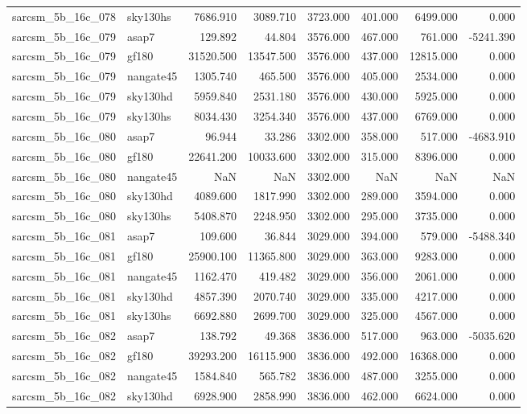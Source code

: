 \begin{tabular}{llrrrrrr}
sarcsm\_5b\_16c\_078 & sky130hs & 7686.910 & 3089.710 & 3723.000 & 401.000 & 6499.000 & 0.000 \\
sarcsm\_5b\_16c\_079 & asap7 & 129.892 & 44.804 & 3576.000 & 467.000 & 761.000 & -5241.390 \\
sarcsm\_5b\_16c\_079 & gf180 & 31520.500 & 13547.500 & 3576.000 & 437.000 & 12815.000 & 0.000 \\
sarcsm\_5b\_16c\_079 & nangate45 & 1305.740 & 465.500 & 3576.000 & 405.000 & 2534.000 & 0.000 \\
sarcsm\_5b\_16c\_079 & sky130hd & 5959.840 & 2531.180 & 3576.000 & 430.000 & 5925.000 & 0.000 \\
sarcsm\_5b\_16c\_079 & sky130hs & 8034.430 & 3254.340 & 3576.000 & 437.000 & 6769.000 & 0.000 \\
sarcsm\_5b\_16c\_080 & asap7 & 96.944 & 33.286 & 3302.000 & 358.000 & 517.000 & -4683.910 \\
sarcsm\_5b\_16c\_080 & gf180 & 22641.200 & 10033.600 & 3302.000 & 315.000 & 8396.000 & 0.000 \\
sarcsm\_5b\_16c\_080 & nangate45 & NaN & NaN & 3302.000 & NaN & NaN & NaN \\
sarcsm\_5b\_16c\_080 & sky130hd & 4089.600 & 1817.990 & 3302.000 & 289.000 & 3594.000 & 0.000 \\
sarcsm\_5b\_16c\_080 & sky130hs & 5408.870 & 2248.950 & 3302.000 & 295.000 & 3735.000 & 0.000 \\
sarcsm\_5b\_16c\_081 & asap7 & 109.600 & 36.844 & 3029.000 & 394.000 & 579.000 & -5488.340 \\
sarcsm\_5b\_16c\_081 & gf180 & 25900.100 & 11365.800 & 3029.000 & 363.000 & 9283.000 & 0.000 \\
sarcsm\_5b\_16c\_081 & nangate45 & 1162.470 & 419.482 & 3029.000 & 356.000 & 2061.000 & 0.000 \\
sarcsm\_5b\_16c\_081 & sky130hd & 4857.390 & 2070.740 & 3029.000 & 335.000 & 4217.000 & 0.000 \\
sarcsm\_5b\_16c\_081 & sky130hs & 6692.880 & 2699.700 & 3029.000 & 325.000 & 4567.000 & 0.000 \\
sarcsm\_5b\_16c\_082 & asap7 & 138.792 & 49.368 & 3836.000 & 517.000 & 963.000 & -5035.620 \\
sarcsm\_5b\_16c\_082 & gf180 & 39293.200 & 16115.900 & 3836.000 & 492.000 & 16368.000 & 0.000 \\
sarcsm\_5b\_16c\_082 & nangate45 & 1584.840 & 565.782 & 3836.000 & 487.000 & 3255.000 & 0.000 \\
sarcsm\_5b\_16c\_082 & sky130hd & 6928.900 & 2858.990 & 3836.000 & 462.000 & 6624.000 & 0.000 \\

\end{tabular}
